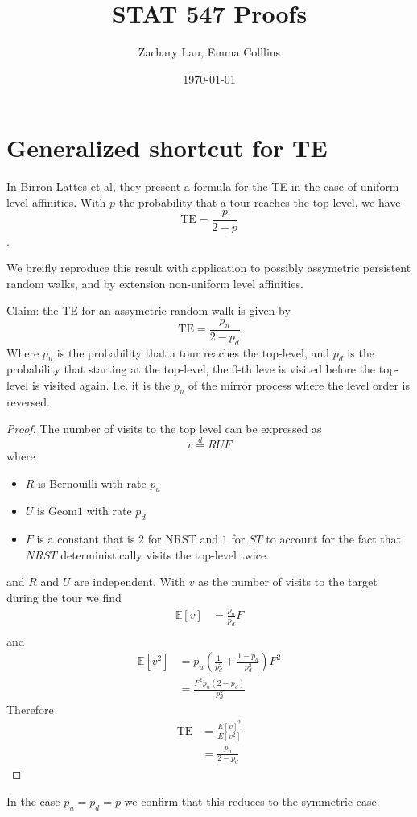 \documentclass{article}
\title{STAT 547 Proofs}
\author{Zachary Lau, Emma Colllins}
\date{\today}
\begin{document}
\maketitle

\section{Generalized shortcut for TE}
In Birron-Lattes et al, they present a formula for the TE in the case of uniform
level affinities. With $p$ the probability that a tour reaches the top-level, we
have \[ \text{TE} = \frac{p}{2-p}\].

We breifly reproduce this result with application to possibly assymetric
persistent random walks, and by extension non-uniform level affinities.

Claim: the TE for an assymetric random walk is given by \[ \text{TE} =
\frac{p_u}{2-p_d} \]
Where $p_u$ is the probability that a tour reaches the top-level, and $p_d$ is
the probability that starting at the top-level, the $0$-th leve is visited
before the top-level is visited again. I.e. it is the $p_u$ of the mirror
process where the level order is reversed.

\begin{proof}
The number of visits to the top level can be expressed as \[ v \overset{d}{=} RUF \]
where \begin{itemize}
    \item $R$ is Bernouilli with rate $p_u$
    \item $U$ is $\text{Geom1}$ with rate $p_d$
    \item $F$ is a constant that is $2$ for NRST and $1$ for $ST$ to account for
    the fact that $NRST$ deterministically visits the top-level twice.
\end{itemize}
and $R$ and $U$ are independent. With $v$ as the number of visits to the target
during the tour we find
\begin{align*}
\mathbb E[v] &= \frac{p_u}{p_d}F \\
\end{align*}
and 
\begin{align*}
\mathbb E[v^2] &= p_u \left(\frac{1}{p_d^2}+\frac{1-p_d}{p_d^2}\right) F^2 \\
&= \frac{F^2p_u(2-p_d)}{p_d^2}
\end{align*}
Therefore
\begin{align*}
\text{TE} &= \frac{E[v]^2}{E[v^2]} \\
&= \frac{p_u}{2-p_d}
\end{align*}
\end{proof}
In the case $p_u = p_d = p$ we confirm that this reduces to the symmetric case.
\end{document}
